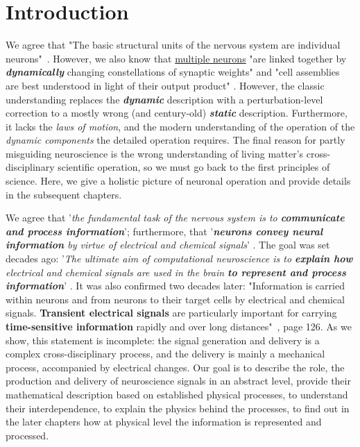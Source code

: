 
\section{Introduction\label{sec:Single-Introduction}}




We agree that "The basic structural units of the nervous system are individual neurons"~\cite{JohnstonWuNeurophysiology:1995}. However,
we also know that \hyperlink{Multiple_neurons}{multiple neurons} "are linked together
by \textit{\textbf{dynamically}} changing constellations of synaptic weights" and
"cell assemblies are best understood in light of their output product" \cite{BuzsakiCellAssemblies:2010}. However, the classic understanding replaces the \textbf{\textit{dynamic}} description with 
a perturbation-level correction to a mostly wrong (and century-old) \textbf{\textit{static}} description. Furthermore, it lacks the \textit{laws of motion}, and the modern understanding of the operation of the \textit{dynamic components} the detailed operation requires.
The final reason for partly misguiding neuroscience is
the wrong understanding of living matter's cross-disciplinary scientific operation, so we must go back to the first principles
of science. Here, we give
a holistic picture of neuronal operation and provide details in the subsequent chapters. 

We agree that '\textit{the fundamental task of the nervous system is to \textbf{communicate and process information}}';
furthermore, that '\textit{\textbf{neurons convey
		neural information} by virtue of electrical and chemical signals}'
\cite{JohnstonWuNeurophysiology:1995}.
The goal was set decades ago:
'\textit{The ultimate aim of computational neuroscience is
	to \textbf{explain how} electrical and chemical signals are used in the brain
	\textbf{to represent and process information}}'
\cite{SejnowskiComputationalNeuroscience:1988}.
It was also confirmed two decades later: "Information is carried within neurons and from
neurons to their target cells by electrical and chemical
signals. \textbf{Transient electrical signals} are particularly
important for carrying \textbf{time-sensitive information} rapidly and over long distances"~\cite{PrinciplesNeuralScience:2013}, page 126.
As we show, this statement is incomplete:
the signal generation and delivery is a complex cross-disciplinary process, and the delivery is mainly a 
mechanical process, accompanied by electrical changes.
Our goal is to describe the role, the production and delivery of neuroscience signals in an abstract level, provide their mathematical description based on established physical processes, to understand their interdependence, to explain the physics behind the processes, to find out in the later chapters how at physical level the information is represented and processed.

